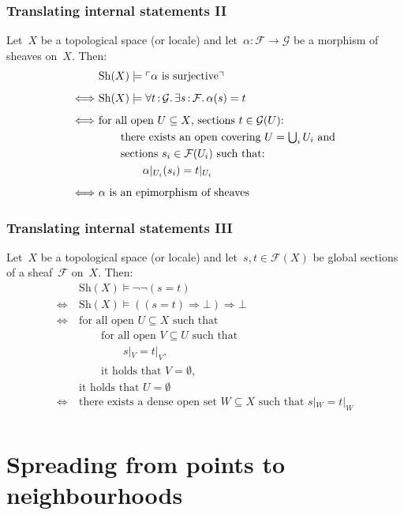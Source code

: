 \documentclass[12pt,utf8,notheorems,compress,t]{beamer}
\newcommand{\F}{\mathcal{F}}
\renewcommand{\G}{\mathcal{G}}
\newcommand{\Sh}{\mathrm{Sh}}
\renewcommand{\_}{\mathpunct{.}}
\newcommand{\?}{\,{:}\,}
\newcommand{\speak}[1]{\ulcorner\text{\textnormal{#1}}\urcorner}
\begin{document}
\begin{frame}\frametitle{Translating internal statements II}
  Let~$X$ be a topological space (or locale) and let~$\alpha : \F \to \G$ be a
  morphism of sheaves on~$X$. Then:
  \allowdisplaybreaks
  \begin{align*}
    & \Sh(X) \models \speak{$\alpha$ is surjective} \\[0.5em]
    \Longleftrightarrow\
    & \Sh(X) \models \forall t\?\G\_ \exists s\?\F\_ \alpha(s) = t \\[0.5em]
    \Longleftrightarrow\ &
      \text{for all open~$U \subseteq X$, sections $t \in \G(U)$:} \\
    &\qquad
      \text{there exists an open covering~$U = \textstyle\bigcup_i U_i$ and} \\
    &\qquad
      \text{sections~$s_i \in \F(U_i)$ such that:} \\
    &\qquad\qquad
        \alpha|_{U_i}(s_i) = t|_{U_i} \\[0.5em]
    \Longleftrightarrow\ &
      \text{$\alpha$ is an epimorphism of sheaves}
  \end{align*}
\end{frame}

\begin{frame}\frametitle{Translating internal statements III}
  Let~$X$ be a topological space (or locale) and let~$s, t \in \F(X)$ be global
  sections of a sheaf~$\F$ on~$X$. Then:
  \allowdisplaybreaks
  \begin{align*}
    & \Sh(X) \models \neg\neg(s = t) \\[0.5em]
    \Longleftrightarrow\
    & \Sh(X) \models ((s = t) \Rightarrow \bot) \Rightarrow \bot \\[0.5em]
    \Longleftrightarrow\ &
      \text{for all open~$U \subseteq X$ such that} \\
    &\qquad
      \text{for all open~$V \subseteq U$ such that} \\
    &\qquad\qquad
      s|_V = t|_V, \\
    &\qquad
      \text{it holds that~$V = \emptyset$,} \\
    &
      \text{it holds that~$U = \emptyset$} \\[0.5em]
    \Longleftrightarrow\ &
      \text{there exists a dense open set~$W \subseteq X$ such that $s|_W = t|_W$} \\
  \end{align*}
\end{frame}


\section{Spreading from points to neighbourhoods}
\end{document}
